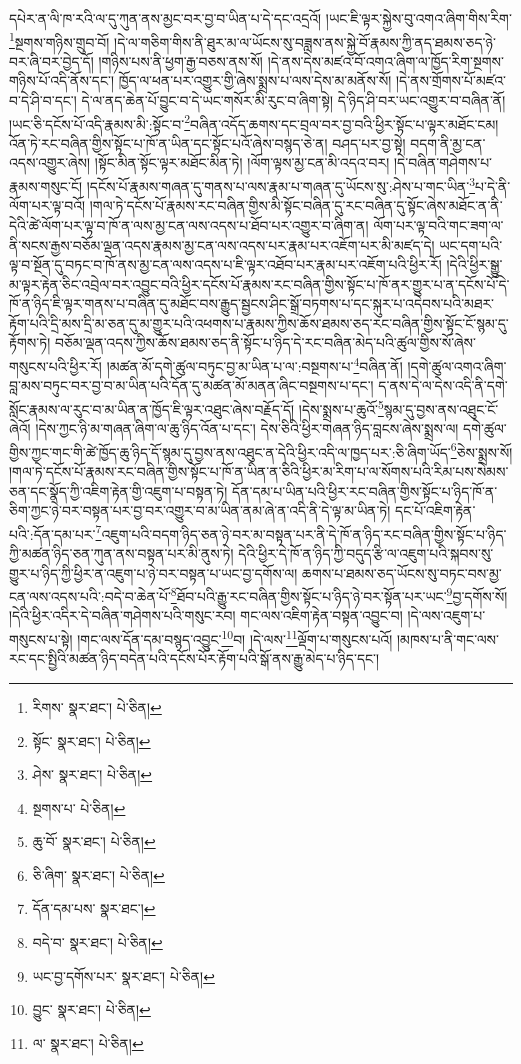 དཔེར་ན་ལི་ཁ་རའི་ལ་དུ་ཀུན་ནས་མྱང་བར་བྱ་བ་ཡིན་པ་དེ་དང་འདྲའོ། །ཡང་ཇི་ལྟར་སྐྱེས་བུ་འགའ་ཞིག་གིས་རིག་\footnote{རིགས་  སྣར་ཐང་།  པེ་ཅིན། }སྔགས་གཉིས་གྲུབ་བོ། །དེ་ལ་གཅིག་གིས་ནི་ཐུར་མ་ལ་ཡོངས་སུ་བཟླས་ནས་སྐྱེ་བོ་རྣམས་ཀྱི་ནད་ཐམས་ཅད་ཉེ་བར་ཞི་བར་བྱེད་དོ། །གཉིས་པས་ནི་ཕྱག་རྒྱ་བཅས་ནས་སོ། །དེ་ནས་དེས་མཛའ་བོ་འགའ་ཞིག་ལ་ཁྱོད་རིག་སྔགས་གཉིས་པོ་འདི་ནོས་དང་། ཁྱོད་ལ་ཕན་པར་འགྱུར་གྱི་ཞེས་སྨྲས་པ་ལས་དེས་མ་མནོས་སོ། །དེ་ནས་གྲོགས་པོ་མཛའ་བ་དེ་ཤི་བ་དང་། དེ་ལ་ནད་ཆེན་པོ་བྱུང་བ་དེ་ཡང་གསོར་མི་རུང་བ་ཞིག་སྟེ། དེ་ཉིད་ཤི་བར་ཡང་འགྱུར་བ་བཞིན་ནོ། །ཡང་ཅི་དངོས་པོ་འདི་རྣམས་མི་:སྟོང་བ་\footnote{སྟོང་  སྣར་ཐང་།  པེ་ཅིན། }བཞིན་འདོད་ཆགས་དང་བྲལ་བར་བྱ་བའི་ཕྱིར་སྟོང་པ་ལྟར་མཐོང་ངམ། འོན་ཏེ་རང་བཞིན་གྱིས་སྟོང་པ་ཁོ་ན་ཡིན་དང་སྟོང་པའོ་ཞེས་བསྙད་ཅེ་ན། བཤད་པར་བྱ་སྟེ། བདག་ནི་མྱ་ངན་འདས་འགྱུར་ཞེས། །སྟོང་མིན་སྟོང་ལྟར་མཐོང་མིན་ཏེ། །ལོག་ལྟས་མྱ་ངན་མི་འདའ་བར། །དེ་བཞིན་གཤེགས་པ་རྣམས་གསུང་ངོ། །དངོས་པོ་རྣམས་གཞན་དུ་གནས་པ་ལས་རྣམ་པ་གཞན་དུ་ཡོངས་སུ་:ཤེས་པ་གང་ཡིན་\footnote{ཤེས་  སྣར་ཐང་།  པེ་ཅིན། }པ་དེ་ནི་ལོག་པར་ལྟ་བའོ། །གལ་ཏེ་དངོས་པོ་རྣམས་རང་བཞིན་གྱིས་མི་སྟོང་བཞིན་དུ་རང་བཞིན་དུ་སྟོང་ཞེས་མཐོང་ན་ནི་དེའི་ཚེ་ལོག་པར་ལྟ་བ་ཁོ་ན་ལས་མྱ་ངན་ལས་འདས་པ་ཐོབ་པར་འགྱུར་བ་ཞིག་ན། ལོག་པར་ལྟ་བའི་གང་ཟག་ལ་ནི་སངས་རྒྱས་བཅོམ་ལྡན་འདས་རྣམས་མྱ་ངན་ལས་འདས་པར་རྣམ་པར་འཇོག་པར་མི་མཛད་དེ། ཡང་དག་པའི་ལྟ་བ་སྔོན་དུ་བཏང་བ་ཁོ་ནས་མྱ་ངན་ལས་འདས་པ་ཇི་ལྟར་འཐོབ་པར་རྣམ་པར་འཇོག་པའི་ཕྱིར་རོ། །དེའི་ཕྱིར་སྒྱུ་མ་ལྟར་རྟེན་ཅིང་འབྲེལ་བར་འབྱུང་བའི་ཕྱིར་དངོས་པོ་རྣམས་རང་བཞིན་གྱིས་སྟོང་པ་ཁོ་ནར་གྱུར་པ་ན་དངོས་པོ་དེ་ཁོ་ན་ཉིད་ཇི་ལྟར་གནས་པ་བཞིན་དུ་མཐོང་བས་རྒྱུད་སྦྱངས་ཤིང་སྒྲོ་བཏགས་པ་དང་སྐུར་པ་འདེབས་པའི་མཐར་རྟོག་པའི་དྲི་མས་དྲི་མ་ཅན་དུ་མ་གྱུར་པའི་འཕགས་པ་རྣམས་ཀྱིས་ཆོས་ཐམས་ཅད་རང་བཞིན་གྱིས་སྟོང་ངོ་སྙམ་དུ་རྟོགས་ཏེ། བཅོམ་ལྡན་འདས་ཀྱིས་ཆོས་ཐམས་ཅད་ནི་སྟོང་པ་ཉིད་དེ་རང་བཞིན་མེད་པའི་ཚུལ་གྱིས་སོ་ཞེས་གསུངས་པའི་ཕྱིར་རོ། །མཚན་མོ་དགེ་ཚུལ་བཏུང་བྱ་མ་ཡིན་པ་ལ་:བསྔགས་པ་\footnote{སྔགས་པ་  པེ་ཅིན། }བཞིན་ནོ། །དགེ་ཚུལ་འགའ་ཞིག་བླ་མས་བཏུང་བར་བྱ་བ་མ་ཡིན་པའི་དོན་དུ་མཚན་མོ་མནན་ཞིང་བསྔགས་པ་དང་། ད་ནས་དེ་ལ་དེས་འདི་ནི་དགེ་སློང་རྣམས་ལ་རུང་བ་མ་ཡིན་ན་ཁྱོད་ཇི་ལྟར་འཐུང་ཞེས་བརྗོད་དོ། །དེས་སྨྲས་པ་ཆུའོ་\footnote{ཆུ་བོ་  སྣར་ཐང་།  པེ་ཅིན། }སྙམ་དུ་བྱས་ནས་འཐུང་ངོ་ཞེའོ། །དེས་ཀྱང་ཉི་མ་གཞན་ཞིག་ལ་ཆུ་ཉིད་འོན་པ་དང་། དེས་ཅིའི་ཕྱིར་གཞན་ཉིད་བླངས་ཞེས་སྨྲས་ལ། དགེ་ཚུལ་གྱིས་ཀྱང་གང་གི་ཚེ་ཁྱོད་ཆུ་ཉིད་དོ་སྙམ་དུ་བྱས་ནས་འཐུང་ན་དེའི་ཕྱིར་འདི་ལ་ཁྱད་པར་:ཅི་ཞིག་ཡོད་\footnote{ཅི་ཞིག་  སྣར་ཐང་།  པེ་ཅིན། }ཅེས་སྨྲས་སོ། །གལ་ཏེ་དངོས་པོ་རྣམས་རང་བཞིན་གྱིས་སྟོང་པ་ཁོ་ན་ཡིན་ན་ཅིའི་ཕྱིར་མ་རིག་པ་ལ་སོགས་པའི་རིམ་པས་སེམས་ཅན་དང་སྣོད་ཀྱི་འཇིག་རྟེན་གྱི་འཇུག་པ་བསྟན་ཏེ། དོན་དམ་པ་ཡིན་པའི་ཕྱིར་རང་བཞིན་གྱིས་སྟོང་པ་ཉིད་ཁོ་ན་ཅིག་ཀྱང་ཉེ་བར་བསྟན་པར་བྱ་བར་འགྱུར་བ་མ་ཡིན་ནམ་ཞེ་ན་འདི་ནི་དེ་ལྟ་མ་ཡིན་ཏེ། དང་པོ་འཇིག་རྟེན་པའི་:དོན་དམ་པར་\footnote{དོན་དམ་པས་  སྣར་ཐང་། }འཇུག་པའི་བདག་ཉིད་ཅན་ཉེ་བར་མ་བསྟན་པར་ནི་དེ་ཁོ་ན་ཉིད་རང་བཞིན་གྱིས་སྟོང་པ་ཉིད་ཀྱི་མཚན་ཉིད་ཅན་ཀུན་ནས་བསྟན་པར་མི་ནུས་ཏེ། དེའི་ཕྱིར་དེ་ཁོ་ན་ཉིད་ཀྱི་བདུད་རྩི་ལ་འཇུག་པའི་སྐབས་སུ་གྱུར་པ་ཉིད་ཀྱི་ཕྱིར་ན་འཇུག་པ་ཉེ་བར་བསྟན་པ་ཡང་བྱ་དགོས་ལ། ཆགས་པ་ཐམས་ཅད་ཡོངས་སུ་བཏང་བས་མྱ་ངན་ལས་འདས་པའི་:བདེ་བ་ཆེན་པོ་\footnote{བདེ་བ་  སྣར་ཐང་།  པེ་ཅིན། }ཐོབ་པའི་རྒྱུ་རང་བཞིན་གྱིས་སྟོང་པ་ཉིད་ཉེ་བར་སྟོན་པར་ཡང་\footnote{ཡང་བྱ་དགོས་པར་  སྣར་ཐང་།  པེ་ཅིན། }བྱ་དགོས་སོ། །དེའི་ཕྱིར་འདིར་དེ་བཞིན་གཤེགས་པའི་གསུང་རབ། གང་ལས་འཇིག་རྟེན་བསྟན་འབྱུང་བ། །དེ་ལས་འཇུག་པ་གསུངས་པ་སྟེ། །གང་ལས་དོན་དམ་བསྙད་འབྱུང་\footnote{བྱུང་  སྣར་ཐང་།  པེ་ཅིན། }བ། །དེ་ལས་\footnote{ལ་  སྣར་ཐང་།  པེ་ཅིན། }ལྡོག་པ་གསུངས་པའོ། །མཁས་པ་ནི་གང་ལས་རང་དང་སྤྱིའི་མཚན་ཉིད་བདེན་པའི་དངོས་པོར་རྟོག་པའི་སྒོ་ནས་རྒྱུ་མེད་པ་ཉིད་དང་། 